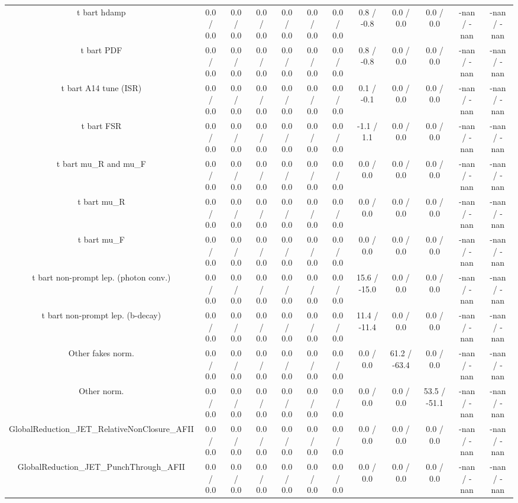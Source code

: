 \begin{table}[htbp]
\begin{center}
\begin{tabular}{|c|c|c|c|c|c|c|c|c|c|c|c|}
  t bar{t} hdamp & 0.0 / 0.0 & 0.0 / 0.0 & 0.0 / 0.0 & 0.0 / 0.0 & 0.0 / 0.0 & 0.0 / 0.0 & 0.8 / -0.8 & 0.0 / 0.0 & 0.0 / 0.0 & -nan / -nan & -nan / -nan \\ 
  t bar{t} PDF & 0.0 / 0.0 & 0.0 / 0.0 & 0.0 / 0.0 & 0.0 / 0.0 & 0.0 / 0.0 & 0.0 / 0.0 & 0.8 / -0.8 & 0.0 / 0.0 & 0.0 / 0.0 & -nan / -nan & -nan / -nan \\ 
  t bar{t} A14 tune (ISR) & 0.0 / 0.0 & 0.0 / 0.0 & 0.0 / 0.0 & 0.0 / 0.0 & 0.0 / 0.0 & 0.0 / 0.0 & 0.1 / -0.1 & 0.0 / 0.0 & 0.0 / 0.0 & -nan / -nan & -nan / -nan \\ 
  t bar{t} FSR & 0.0 / 0.0 & 0.0 / 0.0 & 0.0 / 0.0 & 0.0 / 0.0 & 0.0 / 0.0 & 0.0 / 0.0 & -1.1 / 1.1 & 0.0 / 0.0 & 0.0 / 0.0 & -nan / -nan & -nan / -nan \\ 
  t bar{t}  mu_{R} and  mu_{F} & 0.0 / 0.0 & 0.0 / 0.0 & 0.0 / 0.0 & 0.0 / 0.0 & 0.0 / 0.0 & 0.0 / 0.0 & 0.0 / 0.0 & 0.0 / 0.0 & 0.0 / 0.0 & -nan / -nan & -nan / -nan \\ 
  t bar{t}  mu_{R} & 0.0 / 0.0 & 0.0 / 0.0 & 0.0 / 0.0 & 0.0 / 0.0 & 0.0 / 0.0 & 0.0 / 0.0 & 0.0 / 0.0 & 0.0 / 0.0 & 0.0 / 0.0 & -nan / -nan & -nan / -nan \\ 
  t bar{t}  mu_{F} & 0.0 / 0.0 & 0.0 / 0.0 & 0.0 / 0.0 & 0.0 / 0.0 & 0.0 / 0.0 & 0.0 / 0.0 & 0.0 / 0.0 & 0.0 / 0.0 & 0.0 / 0.0 & -nan / -nan & -nan / -nan \\ 
  t bar{t} non-prompt lep. (photon conv.) & 0.0 / 0.0 & 0.0 / 0.0 & 0.0 / 0.0 & 0.0 / 0.0 & 0.0 / 0.0 & 0.0 / 0.0 & 15.6 / -15.0 & 0.0 / 0.0 & 0.0 / 0.0 & -nan / -nan & -nan / -nan \\ 
  t bar{t} non-prompt lep. (b-decay) & 0.0 / 0.0 & 0.0 / 0.0 & 0.0 / 0.0 & 0.0 / 0.0 & 0.0 / 0.0 & 0.0 / 0.0 & 11.4 / -11.4 & 0.0 / 0.0 & 0.0 / 0.0 & -nan / -nan & -nan / -nan \\ 
  Other fakes norm. & 0.0 / 0.0 & 0.0 / 0.0 & 0.0 / 0.0 & 0.0 / 0.0 & 0.0 / 0.0 & 0.0 / 0.0 & 0.0 / 0.0 & 61.2 / -63.4 & 0.0 / 0.0 & -nan / -nan & -nan / -nan \\ 
  Other norm. & 0.0 / 0.0 & 0.0 / 0.0 & 0.0 / 0.0 & 0.0 / 0.0 & 0.0 / 0.0 & 0.0 / 0.0 & 0.0 / 0.0 & 0.0 / 0.0 & 53.5 / -51.1 & -nan / -nan & -nan / -nan \\ 
  GlobalReduction_JET_RelativeNonClosure_AFII & 0.0 / 0.0 & 0.0 / 0.0 & 0.0 / 0.0 & 0.0 / 0.0 & 0.0 / 0.0 & 0.0 / 0.0 & 0.0 / 0.0 & 0.0 / 0.0 & 0.0 / 0.0 & -nan / -nan & -nan / -nan \\ 
  GlobalReduction_JET_PunchThrough_AFII & 0.0 / 0.0 & 0.0 / 0.0 & 0.0 / 0.0 & 0.0 / 0.0 & 0.0 / 0.0 & 0.0 / 0.0 & 0.0 / 0.0 & 0.0 / 0.0 & 0.0 / 0.0 & -nan / -nan & -nan / -nan \\ 

\end{tabular}
\end{center}
\end{table}
